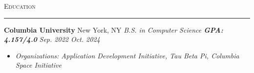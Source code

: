 \documentclass[11pt,letterpaper]{article}
\begin{document}
\vspace{6pt}
\textsc{\large{Education}} 
\vspace{4pt}
\hrule
\begin{list}{}{\setlength{\leftmargin}{1em}\setlength{\rightmargin}{2pt}}
    \item
          

        
            \textbf{Columbia University} \hfill  {New York, NY}
            \vspace{2pt} \newline
            \small{\textit{B.S. in Computer Science \quad \textbf{GPA: 4.157/4.0}}} \hfill {\small{\textit{Sep. 2022 \textendash \space Oct. 2024}}}
            \vspace{0pt}
            \begin{itemize}[itemsep=-5pt, topsep=-2pt]
                \item \small{\textit{Organizations: Application Development Initiative, Tau Beta Pi, Columbia Space Initiative}}
            \end{itemize}
\end{list}

\end{document}

